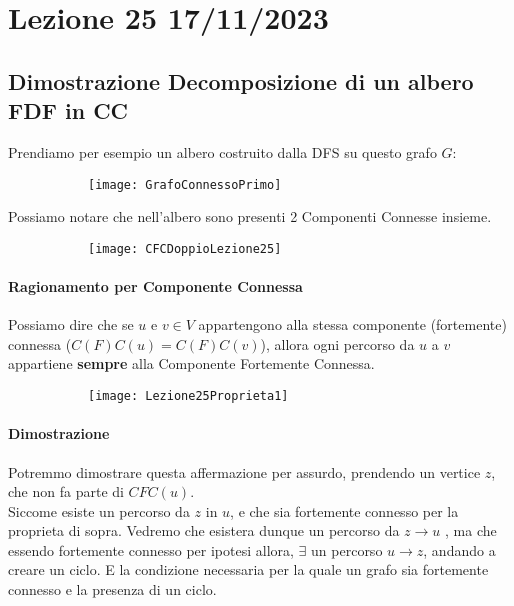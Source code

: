 \section{Lezione 25 17/11/2023}

\subsection{Dimostrazione Decomposizione di un albero FDF in CC}

Prendiamo per esempio un albero costruito dalla DFS su questo grafo $G$:

\begin{figure}[H]
	\centering
	\begin{subfigure}[b]{0.30\textwidth}
		\texttt{[image: GrafoConnessoPrimo]} 
	\end{subfigure}
\end{figure}



Possiamo notare che nell'albero sono presenti 2 Componenti Connesse insieme.\\

\begin{figure}[H]
	\centering
	\begin{subfigure}[b]{0.25\textwidth}
		\texttt{[image: CFCDoppioLezione25]} 
	\end{subfigure}
\end{figure}

\paragraph{Ragionamento per Componente Connessa}Possiamo dire che se $u$ e $v \in V$ appartengono alla stessa componente (fortemente) connessa ($C(F)C (u) = C(F)C (v)$), allora ogni percorso da $u$ a $v$ appartiene \textbf{sempre} alla Componente Fortemente Connessa. 

\begin{figure}[H]
	\centering
	\begin{subfigure}[b]{0.30\textwidth}
		\texttt{[image: Lezione25Proprieta1]} 
	\end{subfigure}
\end{figure}

\paragraph{Dimostrazione}Potremmo dimostrare questa affermazione per assurdo, prendendo un vertice $z$, che non fa parte di $CFC(u)$.\\
 Siccome esiste un percorso da $z$ in $u$, e che sia fortemente connesso per la proprieta di sopra.
 Vedremo che esistera dunque un percorso da $z \rightarrow u$ , ma che essendo fortemente connesso per ipotesi allora, $\exists $ un percorso $u \rightarrow z$, andando a creare un ciclo. E la condizione necessaria per la quale un grafo sia fortemente connesso e la presenza di un ciclo.
 
